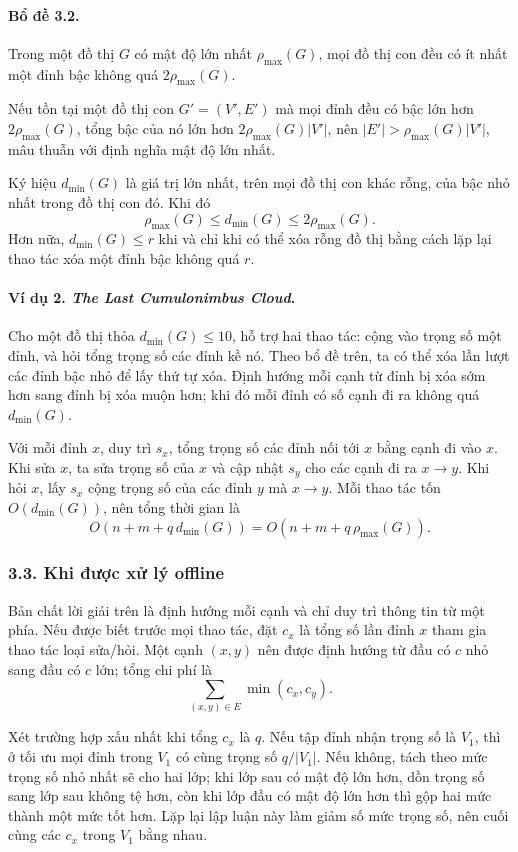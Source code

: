 \documentclass[11pt]{article}
\begin{document}
\paragraph{Bổ đề 3.2.}
Trong một đồ thị \(G\) có mật độ lớn nhất \(\rho_{\max}(G)\), mọi đồ thị con
đều có ít nhất một đỉnh bậc không quá \(2\rho_{\max}(G)\).

Nếu tồn tại một đồ thị con \(G'=(V',E')\) mà mọi đỉnh đều có bậc lớn hơn
\(2\rho_{\max}(G)\), tổng bậc của nó lớn hơn
\(2\rho_{\max}(G)|V'|\), nên \(|E'|>\rho_{\max}(G)|V'|\), mâu thuẫn với định
nghĩa mật độ lớn nhất.

Ký hiệu \(d_{\min}(G)\) là giá trị lớn nhất, trên mọi đồ thị con khác rỗng,
của bậc nhỏ nhất trong đồ thị con đó. Khi đó
\[
  \rho_{\max}(G)\le d_{\min}(G)\le 2\rho_{\max}(G).
\]
Hơn nữa, \(d_{\min}(G)\le r\) khi và chỉ khi có thể xóa rỗng đồ thị bằng cách
lặp lại thao tác xóa một đỉnh bậc không quá \(r\).

\paragraph{Ví dụ 2. \emph{The Last Cumulonimbus Cloud}.}
Cho một đồ thị thỏa \(d_{\min}(G)\le 10\), hỗ trợ hai thao tác: cộng vào trọng
số một đỉnh, và hỏi tổng trọng số các đỉnh kề nó. Theo bổ đề trên, ta có thể
xóa lần lượt các đỉnh bậc nhỏ để lấy thứ tự xóa. Định hướng mỗi cạnh từ đỉnh
bị xóa sớm hơn sang đỉnh bị xóa muộn hơn; khi đó mỗi đỉnh có số cạnh đi ra
không quá \(d_{\min}(G)\).

Với mỗi đỉnh \(x\), duy trì \(s_x\), tổng trọng số các đỉnh nối tới \(x\) bằng
cạnh đi vào \(x\). Khi sửa \(x\), ta sửa trọng số của \(x\) và cập nhật \(s_y\)
cho các cạnh đi ra \(x\to y\). Khi hỏi \(x\), lấy \(s_x\) cộng trọng số của các
đỉnh \(y\) mà \(x\to y\). Mỗi thao tác tốn \(O(d_{\min}(G))\), nên tổng thời
gian là
\[
  O(n+m+q\,d_{\min}(G))=O(n+m+q\,\rho_{\max}(G)).
\]

\subsubsection*{3.3. Khi được xử lý offline}

Bản chất lời giải trên là định hướng mỗi cạnh và chỉ duy trì thông tin từ một
phía. Nếu được biết trước mọi thao tác, đặt \(c_x\) là tổng số lần đỉnh \(x\)
tham gia thao tác loại sửa/hỏi. Một cạnh \((x,y)\) nên được định hướng từ đầu
có \(c\) nhỏ sang đầu có \(c\) lớn; tổng chi phí là
\[
  \sum_{(x,y)\in E}\min(c_x,c_y).
\]

Xét trường hợp xấu nhất khi tổng \(c_x\) là \(q\). Nếu tập đỉnh nhận trọng số là
\(V_1\), thì ở tối ưu mọi đỉnh trong \(V_1\) có cùng trọng số \(q/|V_1|\). Nếu
không, tách theo mức trọng số nhỏ nhất sẽ cho hai lớp; khi lớp sau có mật độ
lớn hơn, dồn trọng số sang lớp sau không tệ hơn, còn khi lớp đầu có mật độ lớn
hơn thì gộp hai mức thành một mức tốt hơn. Lặp lại lập luận này làm giảm số
mức trọng số, nên cuối cùng các \(c_x\) trong \(V_1\) bằng nhau.
\end{document}
